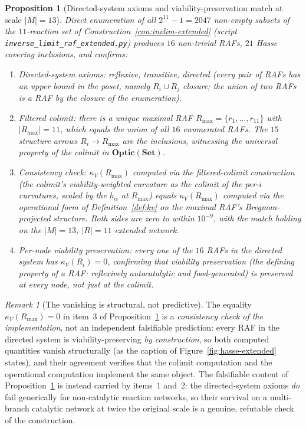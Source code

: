 \documentclass[11pt,a4paper]{article}
\theoremstyle{plain}
\newtheorem{proposition}[theorem]{Proposition}
\theoremstyle{definition}
\theoremstyle{remark}
\newtheorem{remark}[theorem]{Remark}
\newcommand{\kk}{\kappa_{\!V}}
\newcommand{\Optic}{\mathbf{Optic}}
\begin{document}
\begin{proposition}[Directed-system axioms and viability-preservation
match at scale $|M|=13$]
\label{prop:invlim-extended}
Direct enumeration of all $2^{11}-1=2047$ non-empty subsets of the
$11$-reaction set of Construction~\ref{con:invlim-extended} (script
\texttt{inverse\_limit\_raf\_extended.py}) produces $16$ non-trivial
RAFs, $21$ Hasse covering inclusions, and confirms:
\begin{enumerate}[leftmargin=1.4em,itemsep=1pt]
\item \emph{Directed-system axioms}: reflexive, transitive, directed
  (every pair of RAFs has an upper bound in the poset, namely
  $R_i\cup R_j$ closure; the union of two RAFs is a RAF by the
  closure of the enumeration).
\item \emph{Filtered colimit}: there is a unique maximal RAF
  $R_{\max}=\{r_1,\ldots,r_{11}\}$ with $|R_{\max}|=11$, which
  equals the union of all $16$ enumerated RAFs. The $15$ structure
  arrows $R_i \to R_{\max}$ are the
  inclusions, witnessing the universal property of the colimit in
  $\Optic(\mathbf{Set})$.
\item \emph{Consistency check}: $\kk(R_{\max})$ computed via the
  filtered-colimit construction (the colimit's viability-weighted
  curvature as the colimit of the per-$i$ curvatures, scaled by the
  $h_\alpha$ at $R_{\max}$) equals $\kk(R_{\max})$ computed via the
  operational form of Definition~\ref{def:kv} on the
  maximal RAF's Bregman-projected structure. Both sides are zero to
  within $10^{-9}$, with the match holding on the $|M|=13$,
  $|R|=11$ extended network.
\item \emph{Per-node viability preservation}: every one of the $16$
  RAFs in the directed system has $\kk(R_i)=0$, confirming that
  viability preservation (the defining property of a RAF: reflexively
  autocatalytic and food-generated) is preserved at every node, not
  just at the colimit.
\end{enumerate}
\end{proposition}

\begin{remark}[The vanishing is structural, not predictive]
\label{rem:zero-zero}
The equality $\kk(R_{\max})=0$ in item~3 of
Proposition~\ref{prop:invlim-extended} is a \emph{consistency check
of the implementation}, not an independent falsifiable prediction:
every RAF in the directed system is viability-preserving
\emph{by construction}, so both computed quantities vanish
structurally (as the caption of Figure~\ref{fig:hasse-extended}
states), and their agreement verifies that the colimit computation
and the operational computation implement the same object. The
falsifiable content of Proposition~\ref{prop:invlim-extended} is
instead carried by items~1 and~2: the directed-system axioms
\emph{do} fail generically for non-catalytic reaction networks, so
their survival on a multi-branch catalytic network at twice the
original scale is a genuine, refutable check of the construction.
\end{remark}
\end{document}
